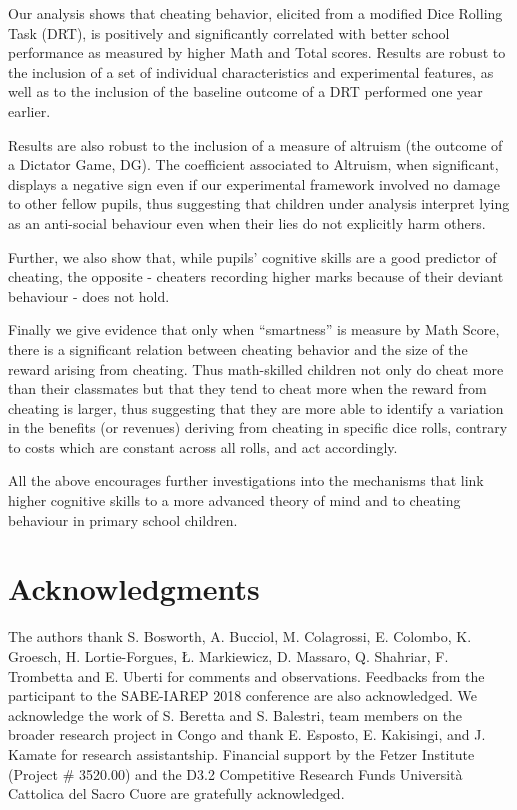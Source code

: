 \documentclass[authoryear, preprint, review, 12pt]{elsarticle}
\begin{document}
Our analysis shows that cheating behavior, elicited from a modified Dice Rolling Task (DRT), is positively and significantly correlated with better school performance as measured by higher Math and Total scores. 
Results are robust to the inclusion of a set of individual characteristics and experimental features, as well as to the inclusion of the baseline outcome of a DRT performed one year earlier. 

Results are also robust to the inclusion of a measure of altruism (the outcome of a Dictator Game, DG). The coefficient associated to Altruism, when significant, displays a negative sign even if our experimental framework involved no damage to other fellow pupils, thus suggesting that children under analysis interpret lying as an anti-social behaviour even when their lies do not explicitly harm others.

Further, we also show that, while pupils' cognitive skills are a good predictor of cheating, the opposite - cheaters recording higher marks because of their deviant behaviour - does not hold. 

Finally we give evidence that only when \enquote{smartness} is measure by Math Score, there is a significant relation between cheating behavior and the size of the reward arising from cheating. Thus  math-skilled children not only do cheat more than their classmates but that they tend to cheat more when the reward from cheating is larger, thus suggesting that they are more able to identify a variation in the benefits (or revenues) deriving from cheating in specific dice rolls, contrary to costs which are constant across all rolls, and act accordingly.   

All the above encourages further investigations into the mechanisms that link higher cognitive skills to a more advanced theory of mind and to cheating behaviour in primary school children.

\clearpage
\section*{Acknowledgments}
The authors thank S. Bosworth, A. Bucciol, M. Colagrossi, E. Colombo, K. Groesch, H. Lortie-Forgues, Ł. Markiewicz, D. Massaro, Q. Shahriar, F. Trombetta and E. Uberti for comments and observations. Feedbacks from the participant to the SABE-IAREP 2018 conference are also acknowledged. We acknowledge the work of S. Beretta and S. Balestri, team members on the broader research project in Congo and thank E. Esposto, E. Kakisingi, and J. Kamate for research assistantship. Financial support by the Fetzer Institute (Project \# 3520.00) and the D3.2 Competitive Research Funds Universit\`a Cattolica del Sacro Cuore are gratefully acknowledged. 
\clearpage
\footnotesize


\end{document}

